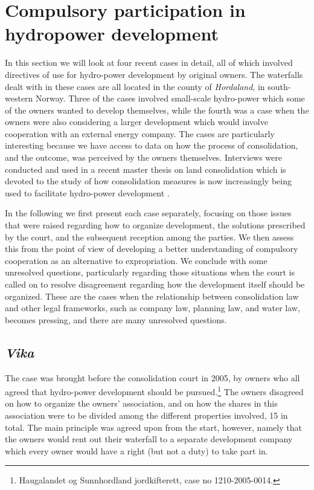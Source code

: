 \section{Compulsory participation in hydropower development}

In this section we will look at four recent cases in detail, all of which involved directives of use for hydro-power development by original owners. The waterfalls dealt with in these cases are all located in the county of \emph{Hordaland}, in south-western Norway. Three of the cases involved small-scale hydro-power which some of the owners wanted to develop themselves, while the fourth was a case when the owners were also considering a larger development which would involve cooperation with an external energy company. The cases are particularly interesting because we have access to data on how the process of consolidation, and the outcome, was perceived by the owners themselves. Interviews were conducted and used in a recent master thesis on land consolidation which is devoted to the study of how consolidation measures is now increasingly being used to facilitate hydro-power development \cite{master}.

In the following we first present each case separately, focusing on those issues that were raised regarding how to organize development, the solutions prescribed by the court, and the subsequent reception among the parties. We then assess this from the point of view of developing a better understanding of compulsory cooperation as an alternative to expropriation. We conclude with some unresolved questions, particularly regarding those situations when the court is called on to resolve disagreement regarding how the development itself should be organized. These are the cases when the relationship between consolidation law and other legal frameworks, such as company law, planning law, and water law, becomes pressing, and there are many unresolved questions.

\subsection{\emph{Vika}}

The case was brought before the consolidation court in 2005, by owners who all agreed that hydro-power development should be pursued.\footnote{Haugalandet og Sunnhordland jordkifterett, case no 1210-2005-0014.} The owners disagreed on how to organize the owners' association, and on how the shares in this association were to be divided among the different properties involved, 15 in total. The main principle was agreed upon from the start, however, namely that the owners would rent out their waterfall to a separate development company which every owner would have a right (but not a duty) to take part in. 

